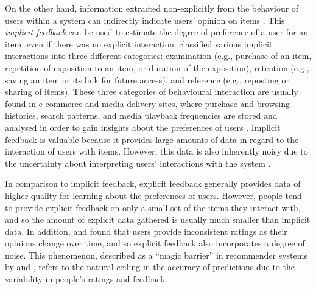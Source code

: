 On the other hand, information extracted non-explicitly from the behaviour of users within a system can indirectly indicate users' opinion on items \autocite{oard98implicit}. This \textit{implicit feedback} can be used to estimate the degree of preference of a user for an item, even if there was no explicit interaction. 
\citeauthor{oard98implicit} classified various implicit interactions into three different categories: examination (e.g., purchase of an item, repetition of exposition to an item, or duration of the exposition), retention (e.g., saving an item or its link for future access), and reference (e.g., reposting or sharing of items). 
These three categories of behavioural interaction are usually found in e-commerce and media delivery sites, where purchase and browsing histories, search patterns, and media playback frequencies are stored and analysed in order to gain insights about the preferences of users \autocite{hu08collaborative}.
Implicit feedback is valuable because it provides large amounts of data in regard to the interaction of users with items. However, this data is also inherently noisy due to the uncertainty about interpreting users' interactions with the system \autocite{pazzani07content}.


In comparison to implicit feedback, explicit feedback generally provides data of higher quality for learning about the preferences of users. However, people tend to provide explicit feedback on only a small set of the items they interact with, and so the amount of explicit data gathered is usually much smaller than implicit data. 
In addition, \textcite{hill95recommending} and \textcite{amatriain09like} found that users provide inconsistent ratings as their opinions change over time, and so explicit feedback also incorporates a degree of noise. This phenomenon, described as a  ``magic barrier'' in recommender systems by \textcite{herlocker04evaluating} and \textcite{bellogin14magic}, refers to the natural ceiling in the accuracy of predictions due to the variability in people's ratings and feedback.

